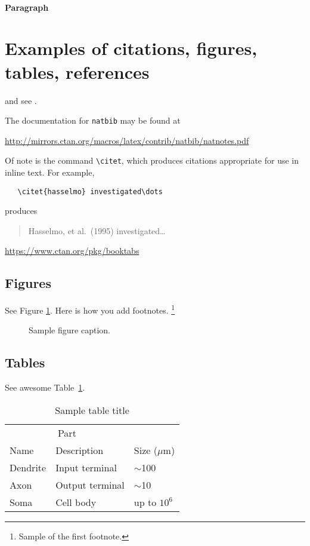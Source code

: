 \documentclass{article}
\theoremstyle{plain}%
\theoremstyle{definition}
\theoremstyle{remark}
\begin{document}
\paragraph{Paragraph}




\section{Examples of citations, figures, tables, references}
\label{sec:others}

\cite{kour2014real,kour2014fast} and see \cite{hadash2018estimate}.

The documentation for \verb+natbib+ may be found at
\begin{center}
  \url{http://mirrors.ctan.org/macros/latex/contrib/natbib/natnotes.pdf}
\end{center}
Of note is the command \verb+\citet+, which produces citations
appropriate for use in inline text.  For example,
\begin{verbatim}
   \citet{hasselmo} investigated\dots
\end{verbatim}
produces
\begin{quote}
  Hasselmo, et al.\ (1995) investigated\dots
\end{quote}

\begin{center}
  \url{https://www.ctan.org/pkg/booktabs}
\end{center}


\subsection{Figures}
See Figure \ref{fig:fig1}. Here is how you add footnotes. \footnote{Sample of the first footnote.}

\begin{figure}
  \centering
  \fbox{\rule[-.5cm]{4cm}{4cm} \rule[-.5cm]{4cm}{0cm}}
  \caption{Sample figure caption.}
  \label{fig:fig1}
\end{figure}

\subsection{Tables}
See awesome Table~\ref{tab:table}.

\begin{table}
 \caption{Sample table title}
  \centering
  \begin{tabular}{lll}
    \toprule
    \multicolumn{2}{c}{Part}                   \\
    \cmidrule(r){1-2}
    Name     & Description     & Size ($\mu$m) \\
    \midrule
    Dendrite & Input terminal  & $\sim$100     \\
    Axon     & Output terminal & $\sim$10      \\
    Soma     & Cell body       & up to $10^6$  \\
    \bottomrule
  \end{tabular}
  \label{tab:table}
\end{table}
\end{document}
